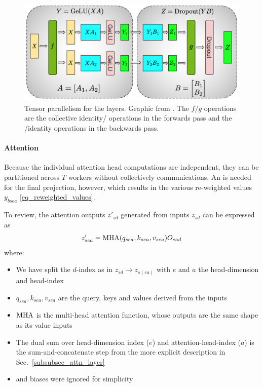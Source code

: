 \documentclass[11pt]{article}
\begin{document}
\begin{figure}[ht]
	\centering
	\includegraphics[scale=.33]{figures/mlp_mp_2.png}
	\caption{Tensor parallelism for the  layers. Graphic from
		\cite{shoeybi2020megatronlm}. The $ f/g $ operations are the collective
		identity/ operations in the forwards pass and the /identity
		operations in the backwards pass.}
	\label{fig_mlp_tensor_parallel}
\end{figure}


\paragraph{Attention} Because the individual attention head computations are independent, they can
be partitioned across $ T $ workers without collectively communications.  An  is
needed for the final projection, however, which results in the various re-weighted values $ y _{
bsea } $ \eqref{eq_reweighted_values}.

To review, the attention outputs $ z' _{ sd } $ generated from inputs $ z_{ sd } $ can be expressed
as
\begin{align}
    z' _{ sea }  &= {\rm  MHA}(q _{ sea }, k _{ sea }, v _{ sea }) O _{ ead }\nonumber\\
\end{align}
where:
\begin{itemize}
    \item  We have split the $ d $-index as in $ z _{ sd }\longrightarrow z _{ s (ea) } $ with $ e $ and
$ a $ the head-dimension and head-index
    \item $ q _{ sea }, k _{ sea }, v _{ sea }
$ are the query, keys and values derived from the inputs
    \item ${\rm
    MHA } $ is the multi-head attention function, whose outputs are the same shape as its value inputs
    \item The dual sum over head-dimension index ($ e $) and attention-head-index ($ a $) is the
    sum-and-concatenate step from the more explicit description in Sec.~\ref{subsubsec_attn_layer}
    \item {} and biases were ignored for simplicity
\end{itemize}
\end{document}
